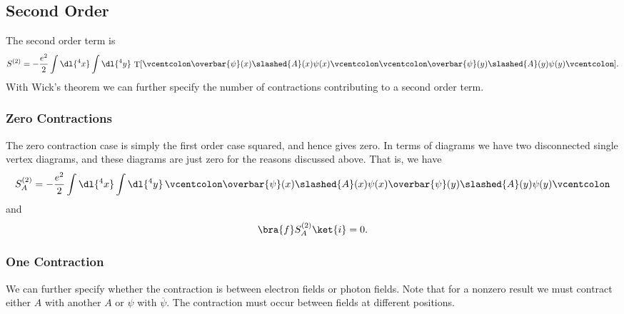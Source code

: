 \documentclass[fleqn]{NotesClass}
\newcommand{\normalordering}[1]{\mathopen{\vcentcolon}{#1}\mathclose{\vcentcolon}}
\DeclareMathOperator{\timeOrdering}{T}
\newcommand{\diracadjoint}[1]{\overbar{#1}}
\begin{document}
    \subsection{Second Order}
    The second order term is
    \begin{equation}
        S^{(2)} = -\frac{e^2}{2} \int \dl{^4x} \int \dl{^4y} \, \timeOrdering[\normalordering{\diracadjoint{\psi}(x)\slashed{A}(x)\psi(x)} \normalordering{\diracadjoint{\psi}(y)\slashed{A}(y)\psi(y)}].
    \end{equation}
    With Wick's theorem we can further specify the number of contractions contributing to a second order term.
    
    \subsubsection{Zero Contractions}
    The zero contraction case is simply the first order case squared, and hence gives zero.
    In terms of diagrams we have two disconnected single vertex diagrams, and these diagrams are just zero for the reasons discussed above.
    That is, we have
    \begin{equation}
        S_A^{(2)} = -\frac{e^2}{2} \int \dl{^4x} \int \dl{^4y} \, \normalordering{\diracadjoint{\psi}(x)\slashed{A}(x)\psi(x) \diracadjoint{\psi}(y)\slashed{A}(y)\psi(y)}
    \end{equation}
    and
    \begin{equation}
        \bra{f} S_A^{(2)}\ket{i} = 0.
    \end{equation}
    
    \subsubsection{One Contraction}
    We can further specify whether the contraction is between electron fields or photon fields.
    Note that for a nonzero result we must contract either \(A\) with another \(A\) or \(\psi\) with \(\diracadjoint{\psi}\).
    The contraction must occur between fields at different positions.
    
\end{document}
